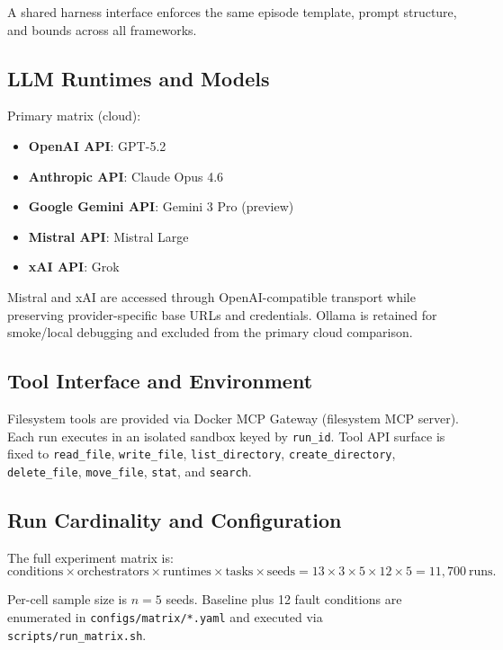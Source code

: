 A shared harness interface enforces the same episode template, prompt structure, and bounds across all frameworks.

\subsection{LLM Runtimes and Models}
\label{sec:runtimes_models}

Primary matrix (cloud):
\begin{itemize}
    \item \textbf{OpenAI API}: GPT-5.2
    \item \textbf{Anthropic API}: Claude Opus 4.6
    \item \textbf{Google Gemini API}: Gemini 3 Pro (preview)
    \item \textbf{Mistral API}: Mistral Large
    \item \textbf{xAI API}: Grok
\end{itemize}

Mistral and xAI are accessed through OpenAI-compatible transport while preserving provider-specific base URLs and credentials. Ollama is retained for smoke/local debugging and excluded from the primary cloud comparison.

\subsection{Tool Interface and Environment}
\label{sec:tools_env}

Filesystem tools are provided via Docker MCP Gateway (filesystem MCP server). Each run executes in an isolated sandbox keyed by \texttt{run\_id}. Tool API surface is fixed to \texttt{read\_file}, \texttt{write\_file}, \texttt{list\_directory}, \texttt{create\_directory}, \texttt{delete\_file}, \texttt{move\_file}, \texttt{stat}, and \texttt{search}.

\subsection{Run Cardinality and Configuration}
\label{sec:cardinality}

The full experiment matrix is:
\[
\text{conditions} \times \text{orchestrators} \times \text{runtimes} \times \text{tasks} \times \text{seeds}
= 13 \times 3 \times 5 \times 12 \times 5 = 11{,}700\ \text{runs}.
\]

Per-cell sample size is \(n=5\) seeds. Baseline plus 12 fault conditions are enumerated in \texttt{configs/matrix/*.yaml} and executed via \texttt{scripts/run\_matrix.sh}.

